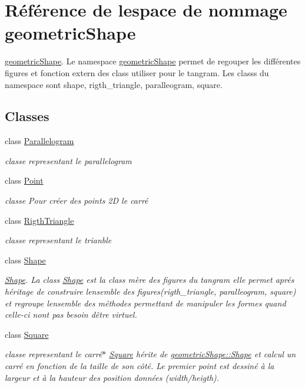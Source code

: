 \hypertarget{namespacegeometric_shape}{}\section{Référence de l\textquotesingle{}espace de nommage geometric\+Shape}
\label{namespacegeometric_shape}


\hyperlink{namespacegeometric_shape}{geometric\+Shape}. Le namespace \hyperlink{namespacegeometric_shape}{geometric\+Shape} permet de regouper les différentes figures et fonction extern des class utiliser pour le tangram. Les classs du namespace sont shape, rigth\+\_\+triangle, paralleogram, square.  


\subsection*{Classes}
\begin{DoxyCompactItemize}
\item 
class \hyperlink{classgeometric_shape_1_1_parallelogram}{Parallelogram}
\begin{DoxyCompactList}\small\item\em classe representant le parallelogram \end{DoxyCompactList}\item 
class \hyperlink{classgeometric_shape_1_1_point}{Point}
\begin{DoxyCompactList}\small\item\em classe Pour créer des points 2D le carré \end{DoxyCompactList}\item 
class \hyperlink{classgeometric_shape_1_1_rigth_triangle}{Rigth\+Triangle}
\begin{DoxyCompactList}\small\item\em classe representant le trianble \end{DoxyCompactList}\item 
class \hyperlink{classgeometric_shape_1_1_shape}{Shape}
\begin{DoxyCompactList}\small\item\em \hyperlink{classgeometric_shape_1_1_shape}{Shape}. La class \hyperlink{classgeometric_shape_1_1_shape}{Shape} est la class mère des figures du tangram elle permet aprés héritage de construire l\textquotesingle{}ensemble des figures(rigth\+\_\+triangle, paralleogram, square) et regroupe l\textquotesingle{}ensemble des méthodes permettant de manipuler les formes quand celle-\/ci n\textquotesingle{}ont pas besoin d\textquotesingle{}être virtuel. \end{DoxyCompactList}\item 
class \hyperlink{classgeometric_shape_1_1_square}{Square}
\begin{DoxyCompactList}\small\item\em classe representant le carré$\ast$ \hyperlink{classgeometric_shape_1_1_square}{Square} hérite de \hyperlink{classgeometric_shape_1_1_shape}{geometric\+Shape\+::\+Shape} et calcul un carré en fonction de la taille de son côté. Le premier point est dessiné à la largeur et à la hauteur des position données (width/heigth).\end{DoxyCompactList}\end{DoxyCompactItemize}
